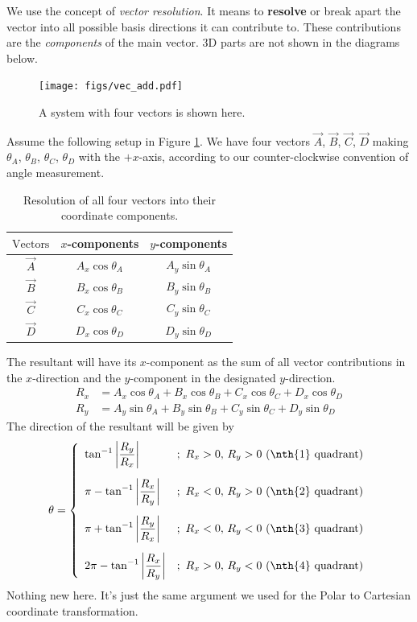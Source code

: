 \documentclass[12pt,b4paper]{article}
\begin{document}
We use the concept of \textit{vector resolution}. It means to \textbf{resolve} or break apart the vector into all possible basis directions it can contribute to. These contributions are the \textit{components} of the main vector. 3D parts are not shown in the diagrams below.
\begin{figure}[H]
    \centering
    \texttt{[image: figs/vec\_add.pdf]}
    \caption{A system with four vectors is shown here.}
    \label{fig:anal_vec_def}
\end{figure}
Assume the following setup in Figure \ref{anal_vec_def}. We have four vectors $\vec{A}$, $\vec{B}$, $\vec{C}$, $\vec{D}$ making $\theta_A$, $\theta_B$, $\theta_C$, $\theta_D$ with the $+x$-axis, according to our counter-clockwise convention of angle measurement. 
\begin{table}[H]
    \centering
    \begin{tabular}{|c|c|c|}
        $\text{Vectors}$ & $x$-components & $y$-components \\\hline
        $\vec{A}$ & $A_x\cos{\theta_A}$ & $A_y\sin{\theta_A}$ \\
        $\vec{B}$ & $B_x\cos{\theta_B}$ & $B_y\sin{\theta_B}$ \\
        $\vec{C}$ & $C_x\cos{\theta_C}$ & $C_y\sin{\theta_C}$ \\
        $\vec{D}$ & $D_x\cos{\theta_D}$ & $D_y\sin{\theta_D}$
    \end{tabular}
    \caption{Resolution of all four vectors into their coordinate components.}
    \label{anal_vec_def}
\end{table}
The resultant will have its $x$-component as the sum of all vector contributions in the $x$-direction and the $y$-component in the designated $y$-direction.
\begin{align*}
    R_x &= A_x\cos{\theta_A}+B_x\cos{\theta_B}+C_x\cos{\theta_C}+D_x\cos{\theta_D}\\
    R_y &= A_y\sin{\theta_A}+B_y\sin{\theta_B}+C_y\sin{\theta_C}+D_y\sin{\theta_D}
\end{align*}
The direction of the resultant will be given by 
\begin{align*}
    \theta=\left\{
                \begin{array}{ll}
                  \displaystyle\tan^{-1}\left|\frac{R_y}{R_x}\right|&;\,\,R_x>0,\,R_y>0\,\,\text{(\nth{1} quadrant)}\\[15pt]
                  \displaystyle\pi-\tan^{-1}\left|\frac{R_x}{R_y}\right|&;\,\,R_x<0,\,R_y>0\,\,\text{(\nth{2} quadrant)}\\[15pt]
                  \displaystyle\pi+\tan^{-1}\left|\frac{R_y}{R_x}\right|&;\,\,R_x<0,\,R_y<0\,\,\text{(\nth{3} quadrant)}\\[15pt]
                  \displaystyle2\pi-\tan^{-1}\left|\frac{R_x}{R_y}\right|&;\,\,R_x>0,\,R_y<0\,\,\text{(\nth{4} quadrant)}
                  \end{array}
              \right.
\end{align*}
Nothing new here. It's just the same argument we used for the Polar to Cartesian coordinate transformation.
\thispagestyle{empty}
\end{document}
